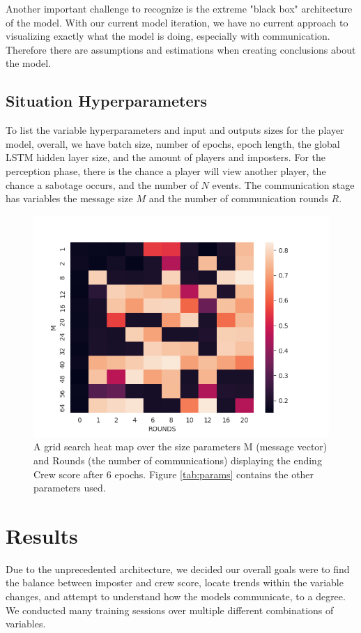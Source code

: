 \documentclass[10pt,twocolumn,letterpaper]{article}
\begin{document}
Another important challenge to recognize is the extreme "black box" architecture
of the model. With our current model iteration, we have no current approach to visualizing
exactly what the model is doing, especially with communication. Therefore there are
assumptions and estimations when creating conclusions about the model.
\subsection{Situation Hyperparameters}
To list the variable hyperparameters and input and outputs sizes for the player model,
overall, we have batch size, number of epochs, epoch length, the global LSTM hidden layer size, 
and the amount of players and imposters. For the perception phase, there is the
chance a player will view another player, the chance a sabotage occurs, and the number of $N$ events.  
The communication stage has variables the message size $M$ and the number of communication rounds
$R$.
\begin{figure}
   \begin{center}
      \includegraphics[width=0.8 \textwidth]{img/grid_search.png}
   \end{center}
      \caption{A grid search heat map over the size parameters M (message vector) 
      and Rounds (the number of communications) displaying the ending Crew score after 6 epochs. Figure \ref{tab:params} contains the other parameters used.
      }
   \label{fig:grid}
\end{figure}
\section{Results}
Due to the unprecedented architecture, we decided our overall goals
were to find the balance between imposter and crew
score, locate trends within the variable changes, and attempt to 
understand how the models communicate, to a degree. We conducted many
training sessions over multiple different combinations of variables.
\end{document}
